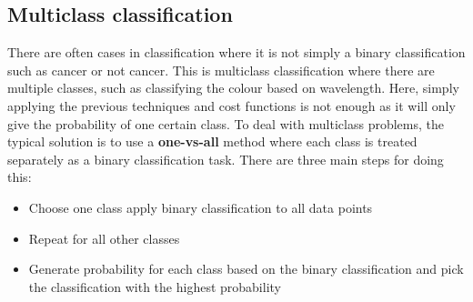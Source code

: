 \documentclass[CS5104-Notes.tex]{subfiles}
\begin{document}
\subsection{Multiclass classification}
There are often cases in classification where it is not simply a binary classification such as cancer or not cancer. This is multiclass classification where there are multiple classes, such as classifying the colour based on wavelength. Here, simply applying the previous techniques and cost functions is not enough as it will only give the probability of one certain class. To deal with multiclass problems, the typical solution is to use a \textbf{one-vs-all} method where each class is treated separately as a binary classification task. There are three main steps for doing this:
\begin{itemize}
\item Choose one class apply binary classification to all data points
\item Repeat for all other classes
\item Generate probability for each class based on the binary classification and pick the classification with the highest probability
\end{itemize}
\end{document}
